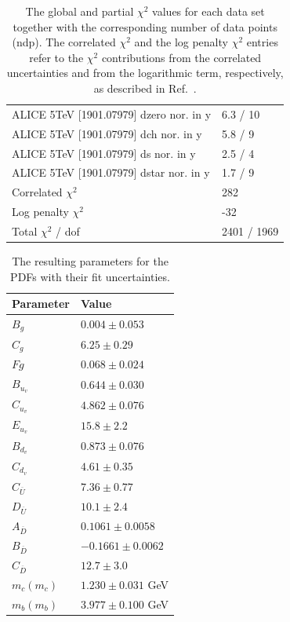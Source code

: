 \documentclass[12pt]{article}
\begin{document}
\begin{table}
\begin{tabular}{ll}
    ALICE 5TeV [1901.07979] dzero nor. in y & 6.3 / 10  \\ 
    ALICE 5TeV [1901.07979] dch nor. in y & 5.8 / 9  \\ 
    ALICE 5TeV [1901.07979] ds nor. in y & 2.5 / 4  \\ 
    ALICE 5TeV [1901.07979] dstar nor. in y & 1.7 / 9  \\ 
    \hline
    Correlated $\chi^2$  & 282  \\ 
    Log penalty $\chi^2$  &  -32  \\ 
    \hline
    Total $\chi^2$ / dof  & 2401 / 1969  \\ 
\end{tabular}
\caption{The global and partial $\chi^2$ values for each data set together with the corresponding number of data points (ndp). The correlated $\chi^2$ and the log penalty $\chi^2$ entries refer to the $\chi^2$ contributions from the correlated uncertainties and from the logarithmic term, respectively, as described in Ref.~\cite{Abramowicz:2015mha}.}
\label{tab:chi}
\end{table}

\begin{table}
    \renewcommand*{\arraystretch}{1.12}
    \centering
\begin{tabular}{ll}
    Parameter & Value \\
    \hline
    $B_g$ & $0.004 \pm 0.053$  \\
    $C_g$ & $6.25 \pm 0.29$  \\
    $Fg$ & $0.068 \pm 0.024$  \\
    $B_{u_v}$ & $0.644 \pm 0.030$  \\
    $C_{u_v}$ & $4.862 \pm 0.076$  \\
    $E_{u_v}$ & $15.8 \pm 2.2$  \\
    $B_{d_v}$ & $0.873 \pm 0.076$  \\
    $C_{d_v}$ & $4.61 \pm 0.35$  \\
    $C_{\overline{U}}$ & $7.36 \pm 0.77$  \\
    $D_{\overline{U}}$ & $10.1 \pm 2.4$  \\
    $A_{\overline{D}}$ & $0.1061 \pm 0.0058$  \\
    $B_{\overline{D}}$ & $-0.1661 \pm 0.0062$  \\
    $C_{\overline{D}}$ & $12.7 \pm 3.0$  \\
    $m_c(m_c)$ & $1.230 \pm 0.031$ GeV  \\
    $m_b(m_b)$ & $3.977 \pm 0.100$ GeV  \\
\end{tabular}
\caption{The resulting parameters for the PDFs with their fit uncertainties.}
\label{tab:pars}
\end{table}
\end{document}
